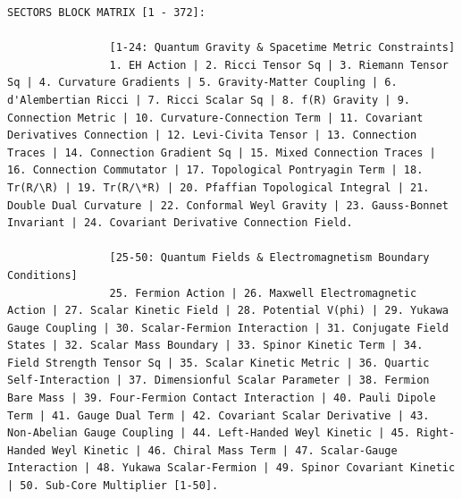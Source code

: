 \documentclass[12pt,a4paper]{article}
\makeatletter
\def\ttfamily{\@noligs\fontfamily\ttdefault\selectfont\sloppy}
\makeatother
\begin{document}
\begin{tcolorbox}
\begin{otherlanguage}{english}
\begin{lstlisting}[basicstyle=\scriptsize\ttfamily, breaklines=true, columns=fullflexible]
				SECTORS BLOCK MATRIX [1 - 372]:
				
				[1-24: Quantum Gravity & Spacetime Metric Constraints]
				1. EH Action | 2. Ricci Tensor Sq | 3. Riemann Tensor Sq | 4. Curvature Gradients | 5. Gravity-Matter Coupling | 6. d'Alembertian Ricci | 7. Ricci Scalar Sq | 8. f(R) Gravity | 9. Connection Metric | 10. Curvature-Connection Term | 11. Covariant Derivatives Connection | 12. Levi-Civita Tensor | 13. Connection Traces | 14. Connection Gradient Sq | 15. Mixed Connection Traces | 16. Connection Commutator | 17. Topological Pontryagin Term | 18. Tr(R/\R) | 19. Tr(R/\*R) | 20. Pfaffian Topological Integral | 21. Double Dual Curvature | 22. Conformal Weyl Gravity | 23. Gauss-Bonnet Invariant | 24. Covariant Derivative Connection Field.
				
				[25-50: Quantum Fields & Electromagnetism Boundary Conditions]
				25. Fermion Action | 26. Maxwell Electromagnetic Action | 27. Scalar Kinetic Field | 28. Potential V(phi) | 29. Yukawa Gauge Coupling | 30. Scalar-Fermion Interaction | 31. Conjugate Field States | 32. Scalar Mass Boundary | 33. Spinor Kinetic Term | 34. Field Strength Tensor Sq | 35. Scalar Kinetic Metric | 36. Quartic Self-Interaction | 37. Dimensionful Scalar Parameter | 38. Fermion Bare Mass | 39. Four-Fermion Contact Interaction | 40. Pauli Dipole Term | 41. Gauge Dual Term | 42. Covariant Scalar Derivative | 43. Non-Abelian Gauge Coupling | 44. Left-Handed Weyl Kinetic | 45. Right-Handed Weyl Kinetic | 46. Chiral Mass Term | 47. Scalar-Gauge Interaction | 48. Yukawa Scalar-Fermion | 49. Spinor Covariant Kinetic | 50. Sub-Core Multiplier [1-50].
				

\end{lstlisting}
\end{otherlanguage}
\end{tcolorbox}
\end{document}
